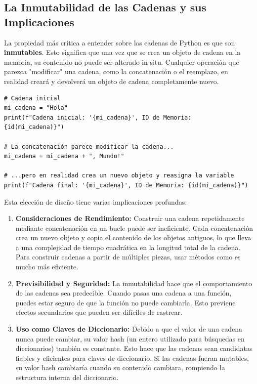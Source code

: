\subsection{La Inmutabilidad de las Cadenas y sus Implicaciones}
\label{subsec:string_immutability}
La propiedad más crítica a entender sobre las cadenas de Python es que son \textbf{inmutables}. Esto significa que una vez que se crea un objeto de cadena en la memoria, su contenido no puede ser alterado in-situ. Cualquier operación que parezca "modificar" una cadena, como la concatenación o el reemplazo, en realidad creará y devolverá un objeto de cadena completamente nuevo.

\text{ }\begin{verbatim}
# Cadena inicial
mi_cadena = "Hola"
print(f"Cadena inicial: '{mi_cadena}', ID de Memoria: {id(mi_cadena)}")

# La concatenación parece modificar la cadena...
mi_cadena = mi_cadena + ", Mundo!"

# ...pero en realidad crea un nuevo objeto y reasigna la variable
print(f"Cadena final: '{mi_cadena}', ID de Memoria: {id(mi_cadena)}")
\end{verbatim}

Esta elección de diseño tiene varias implicaciones profundas:
\begin{enumerate}
    \item \textbf{Consideraciones de Rendimiento:} Construir una cadena repetidamente mediante concatenación en un bucle puede ser ineficiente. Cada concatenación crea un nuevo objeto y copia el contenido de los objetos antiguos, lo que lleva a una complejidad de tiempo cuadrática en la longitud total de la cadena. Para construir cadenas a partir de múltiples piezas, usar métodos como  es mucho más eficiente.
    \item \textbf{Previsibilidad y Seguridad:} La inmutabilidad hace que el comportamiento de las cadenas sea predecible. Cuando pasas una cadena a una función, puedes estar seguro de que la función no puede cambiarla. Esto previene efectos secundarios que pueden ser difíciles de rastrear.
    \item \textbf{Uso como Claves de Diccionario:} Debido a que el valor de una cadena nunca puede cambiar, su valor hash (un entero utilizado para búsquedas en diccionarios) también es constante. Esto hace que las cadenas sean candidatas fiables y eficientes para claves de diccionario. Si las cadenas fueran mutables, su valor hash cambiaría cuando su contenido cambiara, rompiendo la estructura interna del diccionario.
\end{enumerate}

